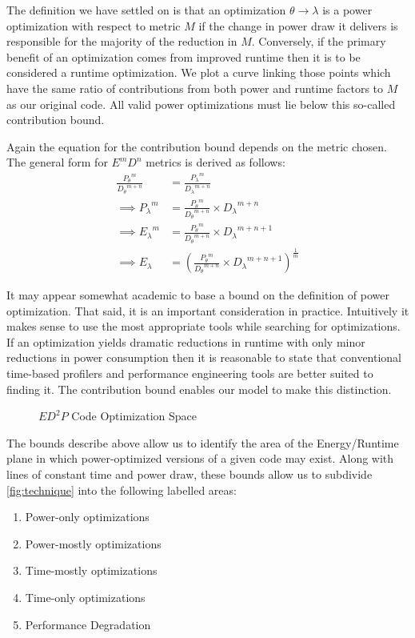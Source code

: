 The definition we have settled on is that an optimization $\theta \to \lambda$ is a power optimization with respect to metric $M$ if the change in power draw it delivers is responsible for the majority of the reduction in $M$. Conversely, if the primary benefit of an optimization comes from improved runtime then it is to be considered a runtime optimization. We plot a curve linking those points which have the same ratio of contributions from both power and runtime factors to $M$ as our original code. All valid power optimizations must lie below this so-called contribution bound. 

Again the equation for the contribution bound depends on the metric chosen.
The general form for $E^mD^n$ metrics is derived as follows:
\begin{align}
\frac{{P_{\theta}}^m}{{D_{\theta}}^{m+n}} &= \frac{{P_{\lambda}}^m}{{D_{\lambda}}^{m+n}} \nonumber \\
\implies {P_{\lambda}}^m &= \frac{{P_{\theta}}^m}{{D_{\theta}}^{m+n}} \times {D_\lambda}^{m+n} \nonumber \\ 
\implies {E_{\lambda}}^m &= \frac{{P_{\theta}}^m}{{D_{\theta}}^{m+n}} \times {D_\lambda}^{m+n+1} \nonumber \\ 
\implies E_{\lambda} &= (\frac{{P_{\theta}}^m}{{D_{\theta}}^{m+n}} \times {D_\lambda}^{m+n+1})^{\frac{1}{m}} 
\end{align}

It may appear somewhat academic to base a bound on the definition of power optimization. That said, it is an important consideration in practice. Intuitively it makes sense to use the most appropriate tools while searching for optimizations.  If an optimization yields dramatic reductions in runtime with only minor reductions in power consumption then it is reasonable to state that conventional time-based profilers and performance engineering tools are better suited to finding it. The contribution bound enables our model to make this distinction.

\begin{figure}
\centering

\caption{$ED^2P$ Code Optimization Space}
\label{fig:technique}
\end{figure}
The bounds describe above allow us to identify the area of the Energy/Runtime plane in which power-optimized versions of a given code may exist. 
Along with lines of constant time and power draw, these bounds allow us to subdivide \autoref{fig:technique} into the following labelled areas:
\begin{enumerate}
\item Power-only optimizations
\item Power-mostly optimizations
\item Time-mostly optimizations
\item Time-only optimizations
\item Performance Degradation
\end{enumerate}


